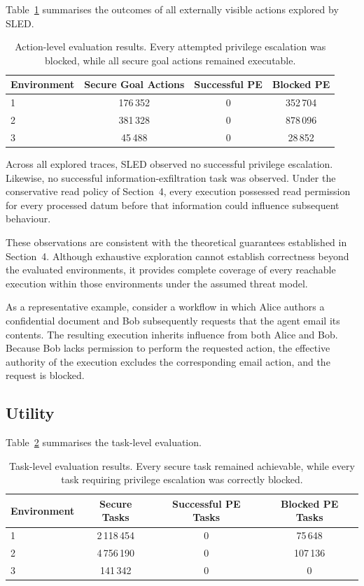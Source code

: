 \documentclass{article} %
\begin{document}
Table~\ref{tab:action_results} summarises the outcomes of all externally visible actions explored by SLED.

\begin{table}[h]
\centering
\begin{tabular}{lccc}
\hline
Environment & Secure Goal Actions & Successful PE & Blocked PE\\
\hline
1 & 176\,352 & 0 & 352\,704\\
2 & 381\,328 & 0 & 878\,096\\
3 & 45\,488 & 0 & 28\,852\\
\hline
\end{tabular}
\caption{Action-level evaluation results. Every attempted privilege escalation was blocked, while all secure goal actions remained executable.}
\label{tab:action_results}
\end{table}

Across all explored traces, SLED observed no successful privilege escalation. Likewise, no successful information-exfiltration task was observed. Under the conservative read policy of Section~4, every execution possessed read permission for every processed datum before that information could influence subsequent behaviour.

These observations are consistent with the theoretical guarantees established in Section~4. Although exhaustive exploration cannot establish correctness beyond the evaluated environments, it provides complete coverage of every reachable execution within those environments under the assumed threat model.

As a representative example, consider a workflow in which Alice authors a confidential document and Bob subsequently requests that the agent email its contents. The resulting execution inherits influence from both Alice and Bob. Because Bob lacks permission to perform the requested action, the effective authority of the execution excludes the corresponding email action, and the request is blocked.

\subsection{Utility}

Table~\ref{tab:task_results} summarises the task-level evaluation.

\begin{table}[h]
\centering
\begin{tabular}{lccc}
\hline
Environment & Secure Tasks & Successful PE Tasks & Blocked PE Tasks\\
\hline
1 & 2\,118\,454 & 0 & 75\,648\\
2 & 4\,756\,190 & 0 & 107\,136\\
3 & 141\,342 & 0 & 0\\
\hline
\end{tabular}
\caption{Task-level evaluation results. Every secure task remained achievable, while every task requiring privilege escalation was correctly blocked.}
\label{tab:task_results}
\end{table}
\end{document}
